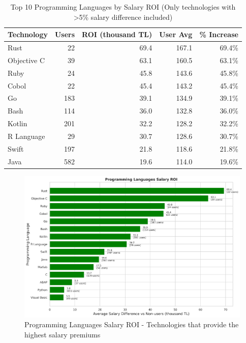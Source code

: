 \documentclass[12pt,a4paper]{article}
\begin{document}
\begin{table}[H]
\centering
\begin{tabular}{lrrrr}
\toprule
\textbf{Technology} & \textbf{Users} & \textbf{ROI (thousand TL)} & \textbf{User Avg} & \textbf{\% Increase} \\
\midrule
Rust & 22 & 69.4 & 167.1 & 69.4\% \\
Objective C & 39 & 63.1 & 160.5 & 63.1\% \\
Ruby & 24 & 45.8 & 143.6 & 45.8\% \\
Cobol & 22 & 45.4 & 143.2 & 45.4\% \\
Go & 183 & 39.1 & 134.9 & 39.1\% \\
Bash & 114 & 36.0 & 132.8 & 36.0\% \\
Kotlin & 201 & 32.2 & 128.2 & 32.2\% \\
R Language & 29 & 30.7 & 128.6 & 30.7\% \\
Swift & 197 & 21.8 & 118.6 & 21.8\% \\
Java & 582 & 19.6 & 114.0 & 19.6\% \\

\bottomrule
\end{tabular}
\caption{Top 10 Programming Languages by Salary ROI (Only technologies with >5\% salary difference included)}
\end{table}

\begin{figure}[H]
    \centering
    \includegraphics[width=\textwidth]{figures/barplot_programming_roi.png}
    \caption{Programming Languages Salary ROI - Technologies that provide the highest salary premiums}
\end{figure}
\end{document}
